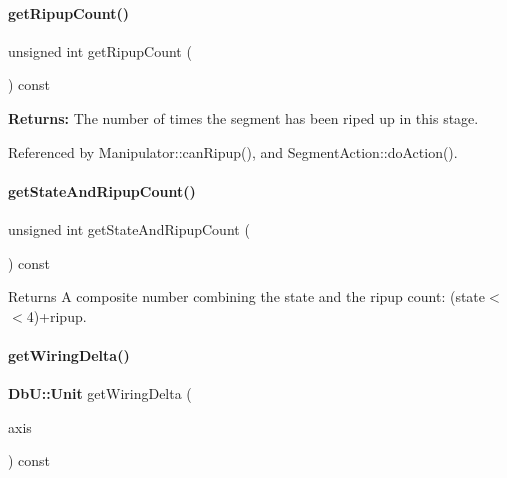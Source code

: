 \paragraph{\texorpdfstring{get\+Ripup\+Count()}{getRipupCount()}}
{\footnotesize\ttfamily unsigned int get\+Ripup\+Count (\begin{DoxyParamCaption}{ }\end{DoxyParamCaption}) const\hspace{0.3cm}{\ttfamily [inline]}}

{\bfseries Returns\+:} The number of times the segment has been riped up in this stage. 

Referenced by Manipulator\+::can\+Ripup(), and Segment\+Action\+::do\+Action().

\mbox{\label{classKite_1_1DataNegociate_acdd169f3bd670279f0a891caa809f99a}} 
\paragraph{\texorpdfstring{get\+State\+And\+Ripup\+Count()}{getStateAndRipupCount()}}
{\footnotesize\ttfamily unsigned int get\+State\+And\+Ripup\+Count (\begin{DoxyParamCaption}{ }\end{DoxyParamCaption}) const\hspace{0.3cm}{\ttfamily [inline]}}

\begin{DoxyReturn}{Returns}
A composite number combining the state and the ripup count\+: {\ttfamily (state$<$$<$4)+ripup}. 
\end{DoxyReturn}
\mbox{\label{classKite_1_1DataNegociate_af920f8ca7404239772e56d00f779cac6}} 
\paragraph{\texorpdfstring{get\+Wiring\+Delta()}{getWiringDelta()}}
{\footnotesize\ttfamily \textbf{ Db\+U\+::\+Unit} get\+Wiring\+Delta (\begin{DoxyParamCaption}\item[{\textbf{ Db\+U\+::\+Unit}}]{axis }\end{DoxyParamCaption}) const}

